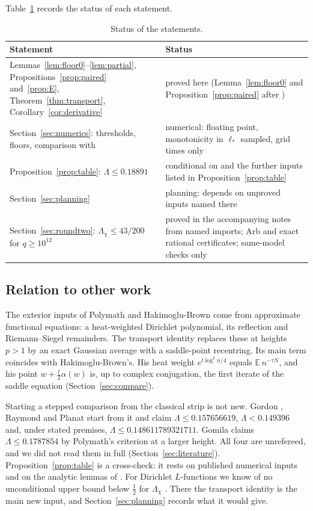 \documentclass[11pt]{article}
\theoremstyle{definition}
\theoremstyle{remark}
\newcommand{\E}{\mathbb E}
\numberwithin{equation}{section}
\begin{document}
Table~\ref{tab:status} records the status of each statement.

\begin{table}[ht]
\centering\small
\begin{tabularx}{\textwidth}{>{\raggedright\arraybackslash}p{}X}
\toprule
Statement & Status\\
\midrule
Lemmas~\ref{lem:floor0}--\ref{lem:partial}, Propositions~\ref{prop:paired} and~\ref{prop:E}, Theorem~\ref{thm:transport}, Corollary~\ref{cor:derivative} & proved here (Lemma~\ref{lem:floor0} and Proposition~\ref{prop:paired} after \cite{p01,hb})\\
Section~\ref{sec:numerics}: thresholds, floors, comparison with \cite{hb} & numerical: floating point, monotonicity in $\ell_*$ sampled, grid times only\\
Proposition~\ref{prop:table}: $\Lambda\le0.18891$ & conditional on \cite[Lemmas~2, 3, 6, 10, Proposition~11, Theorem~12]{hb} and the further inputs listed in Proposition~\ref{prop:table}\\
Section~\ref{sec:planning} & planning: depends on unproved inputs named there\\
Section~\ref{sec:roundtwo}: $\Lambda_\chi\le43/200$ for $q\ge10^{12}$ & proved in the accompanying notes from named imports; Arb and exact rational certificates; same-model checks only\\
\bottomrule
\end{tabularx}
\caption{Status of the statements.}\label{tab:status}
\end{table}

\subsection{Relation to other work}

The exterior inputs of Polymath \cite{polymath} and Hakimoglu-Brown
\cite{hb} come from approximate functional equations: a heat-weighted
Dirichlet polynomial, its reflection and Riemann--Siegel remainders. The
transport identity replaces these at heights $p>1$ by an exact Gaussian
average with a saddle-point recentring. Its main term coincides with
Hakimoglu-Brown's. His heat weight $e^{t\log^2n/4}$ equals
$\E\,n^{-\tau N}$, and his point $w+\frac t2\alpha(w)$ is, up to complex
conjugation, the first iterate of the saddle equation
(Section~\ref{sec:compare}).

Starting a stepped comparison from the classical strip is not new. Gordon
\cite{gordon}, Raymond \cite{raymond} and Planat \cite{planat} start from
it and claim $\Lambda\le0.157656619$, $\Lambda<0.149396$ and, under stated
premises, $\Lambda\le0.148611789321711$. Gomila \cite{gomila} claims
$\Lambda\le0.1787854$ by Polymath's criterion at a larger height. All four
are unrefereed, and we did not read them in full
(Section~\ref{sec:literature}). Proposition~\ref{prop:table} is a cross-check:
it rests on published numerical inputs and on the analytic lemmas of
\cite{hb}. For Dirichlet $L$-functions we know of no unconditional upper
bound below $\frac12$ for $\Lambda_\chi$ \cite{p01}. There the transport identity
is the main new input, and Section~\ref{sec:planning} records what it
would give.
\end{document}
